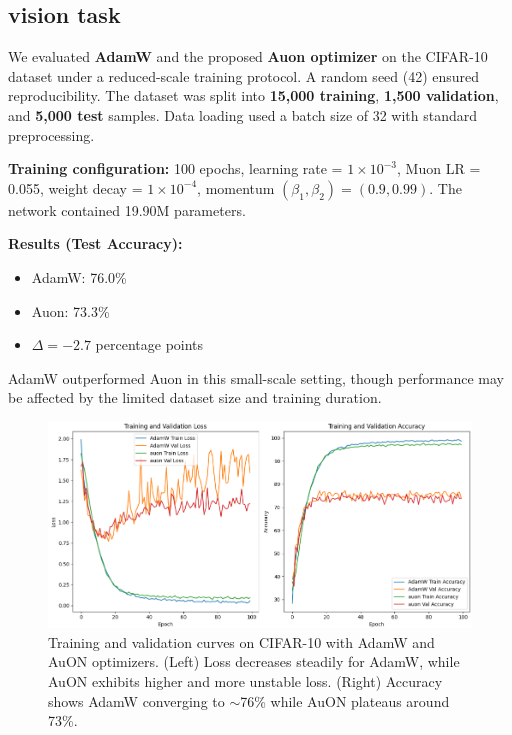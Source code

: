 \documentclass[12pt,a4paper]{article}
\begin{document}
\subsection{vision task}


We evaluated \textbf{AdamW} and the proposed \textbf{Auon optimizer} on the CIFAR-10 dataset under a reduced-scale training protocol. A random seed (42) ensured reproducibility. The dataset was split into \textbf{15,000 training}, \textbf{1,500 validation}, and \textbf{5,000 test} samples. Data loading used a batch size of 32 with standard preprocessing.

\noindent \textbf{Training configuration:} 100 epochs, learning rate = $1\times 10^{-3}$, Muon LR = 0.055, weight decay = $1\times 10^{-4}$, momentum $(\beta_{1}, \beta_{2}) = (0.9, 0.99)$. The network contained 19.90M parameters.

\noindent \textbf{Results (Test Accuracy):}
\begin{itemize}
    \item AdamW: 76.0\%
    \item Auon: 73.3\%
    \item $\Delta = -2.7$ percentage points
\end{itemize}

AdamW outperformed Auon in this small-scale setting, though performance may be affected by the limited dataset size and training duration.
\begin{figure}[!htb]
    \vspace*{\fill}
    \centering
    \includegraphics[width=1\linewidth]{scr.png}
   \caption{Training and validation curves on CIFAR-10 with AdamW and AuON optimizers. 
    (Left) Loss decreases steadily for AdamW, while AuON exhibits higher and more unstable loss. 
    (Right) Accuracy shows AdamW converging to $\sim$76\% while AuON plateaus around 73\%.}
    \label{fig:training_curves}
    \vspace*{\fill}
\end{figure}\\
\end{document}

